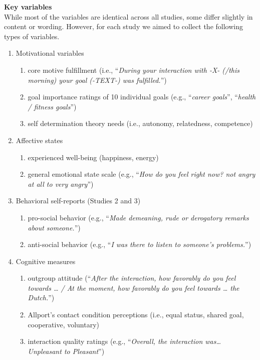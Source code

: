 \documentclass[]{article}
\providecommand{\tightlist}{%
\setlength{\itemsep}{0pt}\setlength{\parskip}{0pt}}
\begin{document}
\textbf{Key variables}\\
While most of the variables are identical across all studies, some
differ slightly in content or wording. However, for each study we aimed
to collect the following types of variables.

\begin{enumerate}
\def\labelenumi{\arabic{enumi}.}
\tightlist
\item
  Motivational variables

  \begin{enumerate}
  \def\labelenumii{\alph{enumii}.}
  \tightlist
  \item
    core motive fulfillment (i.e., ``\emph{During your interaction with
    -X- (/this morning) your goal (-TEXT-) was fulfilled.}'')
  \item
    goal importance ratings of 10 individual goals (e.g., ``\emph{career
    goals}'', ``\emph{health / fitness goals}'')
  \item
    self determination theory needs (i.e., autonomy, relatedness,
    competence)
  \end{enumerate}
\item
  Affective states

  \begin{enumerate}
  \def\labelenumii{\alph{enumii}.}
  \tightlist
  \item
    experienced well-being (happiness, energy)
  \item
    general emotional state scale (e.g., ``\emph{How do you feel right
    now? not angry at all to very angry}'')
  \end{enumerate}
\item
  Behavioral self-reports (Studies 2 and 3)

  \begin{enumerate}
  \def\labelenumii{\alph{enumii}.}
  \tightlist
  \item
    pro-social behavior (e.g., ``\emph{Made demeaning, rude or
    derogatory remarks about someone.}'')
  \item
    anti-social behavior (e.g., ``\emph{I was there to listen to
    someone's problems.}'')
  \end{enumerate}
\item
  Cognitive measures

  \begin{enumerate}
  \def\labelenumii{\alph{enumii}.}
  \tightlist
  \item
    outgroup attitude (``\emph{After the interaction, how favorably do
    you feel towards \ldots{} / At the moment, how favorably do you feel
    towards \ldots{} the Dutch.}'')
  \item
    Allport's contact condition perceptions (i.e., equal status, shared
    goal, cooperative, voluntary)
  \item
    interaction quality ratings (e.g., ``\emph{Overall, the interaction
    was\ldots{} Unpleasant to Pleasant}'')
  \end{enumerate}
\end{enumerate}
\end{document}
